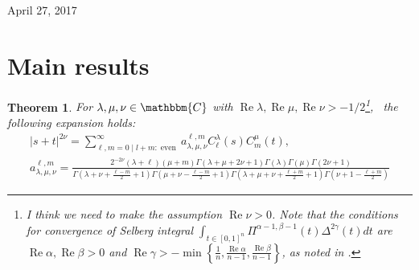 \documentclass{svjour3}
\newcommand{\tmop}[1]{\ensuremath{\operatorname{#1}}}
\newtheorem{theorem}{Theorem}
\begin{document}
April 27, 2017

\section{Main results}

\begin{theorem}
  For $\lambda, \mu, \nu \in \mathbbm{C}$ with $\tmop{Re} \lambda, \tmop{Re}
  \mu, \tmop{Re} \nu > - 1 / 2$\footnote{I think we need to make the
  assumption $\tmop{Re} \nu > 0$. Note that the conditions for convergence of
  Selberg integral $\int_{t \in [0, 1]^n} \Pi^{\alpha - 1, \beta - 1} (t)
  \Delta^{2 \gamma} (t) d t$ are $\tmop{Re} \alpha, \tmop{Re} \beta > 0$ and
  $\tmop{Re} \gamma > - \min \left\{ \frac{1}{n}, \frac{\tmop{Re} \alpha}{n -
  1}, \frac{\tmop{Re} \beta}{n - 1} \right\}$, as noted in
  {\cite{forrester2008importance}}.}, \ the following expansion holds:
  \begin{eqnarray}
    & | s + t |^{2 \nu} = \sum_{\ell, m = 0 \mid l + m :
    \tmop{even}}^{\infty} a_{\lambda, \mu, \nu}^{\ell, m} C_{\ell}^{\lambda}
    (s) C_m^{\mu} (t), &  \nonumber\\
    & a_{\lambda, \mu, \nu}^{\ell, m} = \frac{2^{- 2 \nu} (\lambda + \ell)
    (\mu + m) \Gamma (\lambda + \mu + 2 \nu + 1) \Gamma (\lambda) \Gamma (\mu)
    \Gamma (2 \nu + 1)}{\Gamma \left( \lambda + \nu + \frac{\ell - m}{2} + 1
    \right) \Gamma \left( \mu + \nu - \frac{\ell - m}{2} + 1 \right) \Gamma
    \left( \lambda + \mu + \nu + \frac{\ell + m}{2} + 1 \right) \Gamma \left(
    \nu + 1 - \frac{\ell + m}{2} \right)} &  \nonumber
  \end{eqnarray}
\end{theorem}
\end{document}
